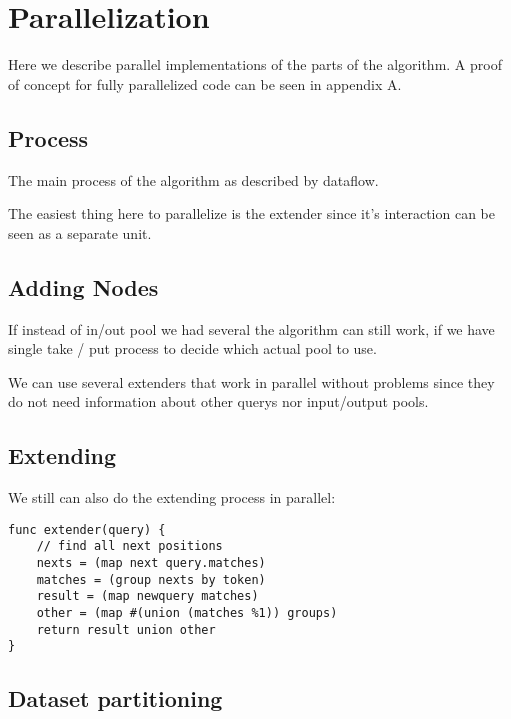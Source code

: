 \chapter{Parallelization}

Here we describe parallel implementations of the parts of the algorithm.
A proof of concept for fully parallelized code can be seen in appendix A.

\section{Process}

The main process of the algorithm as described by dataflow.\cite{Kahn74,Lee95}

\begin{figure}[H]
	
\end{figure}

The easiest thing here to parallelize is the extender since it's interaction
can be seen as a separate unit.

\section{Adding Nodes}

If instead of in/out pool we had several the algorithm can still work, if we
have single take / put process to decide which actual pool to use.

We can use several extenders that work in parallel without problems since 
they do not need information about other querys nor input/output pools.

\section{Extending}

We still can also do the extending process in parallel:

\begin{verbatim}
func extender(query) {
	// find all next positions
	nexts = (map next query.matches)
	matches = (group nexts by token)
	result = (map newquery matches)
	other = (map #(union (matches %1)) groups)
	return result union other
}
\end{verbatim}

\section{Dataset partitioning}

